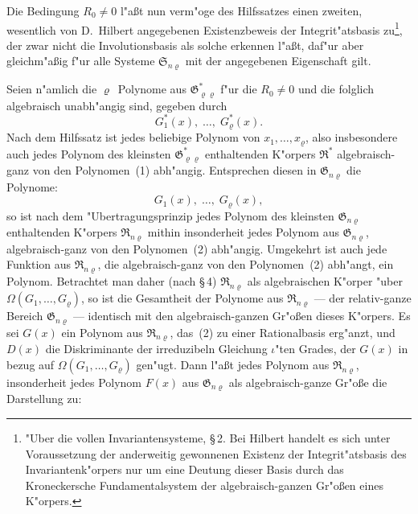 \documentclass[11pt,a4paper]{article}
\begin{document}
Die Bedingung $R_{0}\neq 0$ l"{a}\ss{}t nun verm"{o}ge des Hilfssatzes einen
zweiten, wesentlich von D.~Hilbert angegebenen Existenzbeweis der
Integrit"{a}tsbasis zu\footnote{"{U}ber die vollen Invariantensysteme, \S\,2. Bei Hilbert
handelt es sich unter Voraussetzung der anderweitig gewonnenen Existenz
der Integrit"{a}tsbasis des Invariantenk"{o}rpers nur um eine Deutung dieser
Basis durch das Kroneckersche Fundamentalsystem der algebraisch-ganzen
Gr"{o}\ss{}en eines K"{o}rpers.}, der zwar nicht die Involutionsbasis als solche erkennen
l"{a}\ss{}t, daf"{u}r aber gleichm"{a}\ss{}ig f"{u}r alle Systeme $\mathfrak{S}_{n\varrho}$ mit der angegebenen
Eigenschaft gilt.

Seien n"{a}mlich die $\varrho$~Polynome aus $\mathfrak{G}_{\varrho\varrho}^{*}$ f"{u}r die $R_{0}\neq 0$ und die folglich
algebraisch unabh"{a}ngig sind, gegeben durch
\begin{equation}
G_{1}^{*}(x),\;\dots,\;G_{\varrho}^{*}(x).
\tag{1}
\end{equation}
Nach dem Hilfssatz ist jedes beliebige Polynom von $x_{1},\dots,x_{\varrho}$, also
insbesondere auch jedes Polynom des kleinsten $\mathfrak{G}_{\varrho\varrho}^{*}$ enthaltenden K"{o}rpers
$\mathfrak{R}^{*}$ algebraisch-ganz von den Polynomen~(1) abh"{a}ngig. Entsprechen diesen
in $\mathfrak{G}_{n\varrho}$ die Polynome:
\begin{equation}
G_{1}(x),\;\dots,\;G_{\varrho}(x),
\tag{2}
\end{equation}
so ist nach dem "{U}bertragungsprinzip jedes Polynom des kleinsten $\mathfrak{G}_{n\varrho}$
enthaltenden K"{o}rpers $\mathfrak{R}_{n\varrho}$ mithin insonderheit jedes Polynom aus $\mathfrak{G}_{n\varrho}$,
algebraisch-ganz von den Polynomen~(2) abh"{a}ngig. Umgekehrt ist auch
jede Funktion aus $\mathfrak{R}_{n\varrho}$, die algebraisch-ganz von den Polynomen~(2)
abh"{a}ngt, ein Polynom. Betrachtet man daher (nach \S\,4) $\mathfrak{R}_{n\varrho}$ als
algebraischen K"{o}rper "{u}ber $\Omega(G_{1},\dots,G_{\varrho})$, so ist die Gesamtheit der
Polynome aus $\mathfrak{R}_{n\varrho}$ --- der relativ-ganze Bereich $\mathfrak{G}_{n\varrho}$ --- identisch mit den
algebraisch-ganzen Gr"{o}\ss{}en dieses K"{o}rpers. Es sei $G(x)$ ein Polynom
aus $\mathfrak{R}_{n\varrho}$, das~(2) zu einer Rationalbasis erg"{a}nzt, und $D(x)$ die Diskriminante
der irreduzibeln Gleichung $\iota$"{t}en Grades, der $G(x)$ in bezug auf
$\Omega(G_{1},\dots,G_{\varrho})$ gen"{u}gt. Dann l"{a}\ss{}t jedes Polynom aus $\mathfrak{R}_{n\varrho}$, insonderheit
jedes Polynom $F(x)$ aus $\mathfrak{G}_{n\varrho}$ als algebraisch-ganze Gr"{o}\ss{}e die Darstellung zu:
\end{document}
